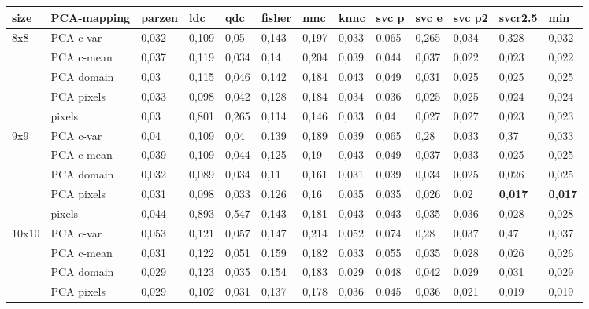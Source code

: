 \documentclass{article}
\begin{document}
\begin{table}[H]
  \small
  \centering
    \begin{tabular}{l|l|llllllllll|l|}
    \hline
    \textbf{size} & \textbf{PCA-mapping} & \textbf{parzen} & \textbf{ldc} & \textbf{qdc} & \textbf{fisher} & \textbf{nmc} & \textbf{knnc} & \textbf{svc p} & \textbf{svc e} & \textbf{svc p2} & \textbf{svcr2.5} & \textbf{min} \\
    \hline \hline
    8x8   & PCA c-var & 0,032 & 0,109 & 0,05  & 0,143 & 0,197 & 0,033 & 0,065 & 0,265 & 0,034 & 0,328 & 0,032 \\
          & PCA c-mean & 0,037 & 0,119 & 0,034 & 0,14  & 0,204 & 0,039 & 0,044 & 0,037 & 0,022 & 0,023 & 0,022 \\
          & PCA domain & 0,03  & 0,115 & 0,046 & 0,142 & 0,184 & 0,043 & 0,049 & 0,031 & 0,025 & 0,025 & 0,025 \\
          & PCA pixels & 0,033 & 0,098 & 0,042 & 0,128 & 0,184 & 0,034 & 0,036 & 0,025 & 0,025 & 0,024 & 0,024 \\
          & pixels & 0,03  & 0,801 & 0,265 & 0,114 & 0,146 & 0,033 & 0,04  & 0,027 & 0,027 & 0,023 & 0,023 \\ \hline
    9x9   & PCA c-var & 0,04  & 0,109 & 0,04  & 0,139 & 0,189 & 0,039 & 0,065 & 0,28  & 0,033 & 0,37  & 0,033 \\
          & PCA c-mean & 0,039 & 0,109 & 0,044 & 0,125 & 0,19  & 0,043 & 0,049 & 0,037 & 0,033 & 0,025 & 0,025 \\
          & PCA domain & 0,032 & 0,089 & 0,034 & 0,11  & 0,161 & 0,031 & 0,039 & 0,034 & 0,025 & 0,026 & 0,025 \\
          & PCA pixels & 0,031 & 0,098 & 0,033 & 0,126 & 0,16  & 0,035 & 0,035 & 0,026 & 0,02  & \textbf{0,017} & \textbf{0,017} \\
          & pixels & 0,044 & 0,893 & 0,547 & 0,143 & 0,181 & 0,043 & 0,043 & 0,035 & 0,036 & 0,028 & 0,028 \\ \hline
    10x10 & PCA c-var & 0,053 & 0,121 & 0,057 & 0,147 & 0,214 & 0,052 & 0,074 & 0,28  & 0,037 & 0,47  & 0,037 \\
          & PCA c-mean & 0,031 & 0,122 & 0,051 & 0,159 & 0,182 & 0,033 & 0,055 & 0,035 & 0,028 & 0,026 & 0,026 \\
          & PCA domain & 0,029 & 0,123 & 0,035 & 0,154 & 0,183 & 0,029 & 0,048 & 0,042 & 0,029 & 0,031 & 0,029 \\
          & PCA pixels & 0,029 & 0,102 & 0,031 & 0,137 & 0,178 & 0,036 & 0,045 & 0,036 & 0,021 & 0,019 & 0,019 \\

\end{tabular}
\end{table}
\end{document}
